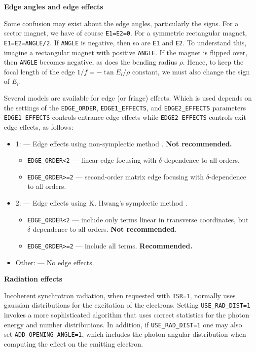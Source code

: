 {\bf Edge angles and edge effects} 

Some confusion may exist about the edge angles, particularly the signs.
For a sector magnet, we have of course \verb|E1=E2=0|.  For a symmetric rectangular
magnet, \verb|E1=E2=ANGLE/2|.  If \verb|ANGLE| is negative, then so are
\verb|E1| and \verb|E2|.  To understand this, imagine a rectangular magnet with positive \verb|ANGLE|.
If the magnet is flipped over, then \verb|ANGLE| becomes negative, as does the bending
radius $\rho$.    Hence, to keep the focal length
of the edge $1/f = -\tan E_i /\rho$ constant, we must also change the sign of
$E_i$.

Several models are available for edge (or fringe) effects. Which is used depends on the
settings of the \verb|EDGE_ORDER|, \verb|EDGE1_EFFECTS|, and \verb|EDGE2_EFFECTS| parameters
\verb|EDGE1_EFFECTS| controls entrance edge effects while \verb|EDGE2_EFFECTS| controls exit edge effects,
as follows:
\begin{itemize}
  \item 1: --- Edge effects using non-symplectic method \cite{KLBrown}. {\bf Not recommended.}
    \begin{itemize}
      \item \verb|EDGE_ORDER<2| --- linear edge focusing with $\delta$-dependence to all orders.
      \item \verb|EDGE_ORDER>=2| --- second-order matrix edge focusing with $\delta$-dependence to all orders.
    \end{itemize}              
  \item 2: --- Edge effects using K. Hwang's symplectic method \cite{KHwang}.
    \begin{itemize}
      \item \verb|EDGE_ORDER<2| --- include only terms linear in transverse coordinates, but $\delta$-dependence to all orders.
      {\bf Not recommended.}
      \item \verb|EDGE_ORDER>=2| --- include all terms. {\bf Recommended.}
    \end{itemize}              
  \item Other: --- No edge effects.
\end{itemize}

{\bf Radiation effects}

Incoherent synchrotron radiation, when requested with {\tt ISR=1},
normally uses gaussian distributions for the excitation of the electrons.
Setting {\tt USE\_RAD\_DIST=1} invokes a more sophisticated algorithm that
uses correct statistics for the photon energy and number distributions.
In addition, if {\tt USE\_RAD\_DIST=1} one may also set {\tt ADD\_OPENING\_ANGLE=1},
which includes the photon angular distribution when computing the effect on 
the emitting electron.  

